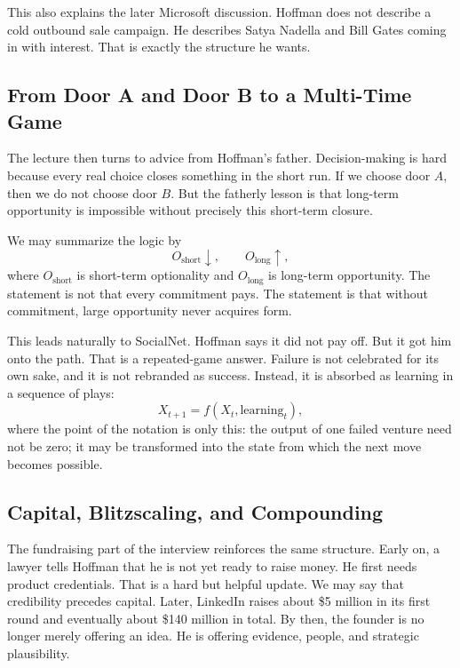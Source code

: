 This also explains the later Microsoft discussion. Hoffman does not describe a cold outbound sale campaign. He describes Satya Nadella and Bill Gates coming in with interest. That is exactly the structure he wants.

\subsection{From Door A and Door B to a Multi-Time Game}

The lecture then turns to advice from Hoffman's father. Decision-making is hard because every real choice closes something in the short run. If we choose door \(A\), then we do not choose door \(B\). But the fatherly lesson is that long-term opportunity is impossible without precisely this short-term closure.

We may summarize the logic by
\begin{equation}
O_{\mathrm{short}}\downarrow, \qquad O_{\mathrm{long}}\uparrow,
\end{equation}
where \(O_{\mathrm{short}}\) is short-term optionality and \(O_{\mathrm{long}}\) is long-term opportunity. The statement is not that every commitment pays. The statement is that without commitment, large opportunity never acquires form.

This leads naturally to SocialNet. Hoffman says it did not pay off. But it got him onto the path. That is a repeated-game answer. Failure is not celebrated for its own sake, and it is not rebranded as success. Instead, it is absorbed as learning in a sequence of plays:
\begin{equation}
X_{t+1}=f(X_t,\text{learning}_t),
\end{equation}
where the point of the notation is only this: the output of one failed venture need not be zero; it may be transformed into the state from which the next move becomes possible.

\subsection{Capital, Blitzscaling, and Compounding}

The fundraising part of the interview reinforces the same structure. Early on, a lawyer tells Hoffman that he is not yet ready to raise money. He first needs product credentials. That is a hard but helpful update. We may say that credibility precedes capital. Later, LinkedIn raises about \$5 million in its first round and eventually about \$140 million in total. By then, the founder is no longer merely offering an idea. He is offering evidence, people, and strategic plausibility.

